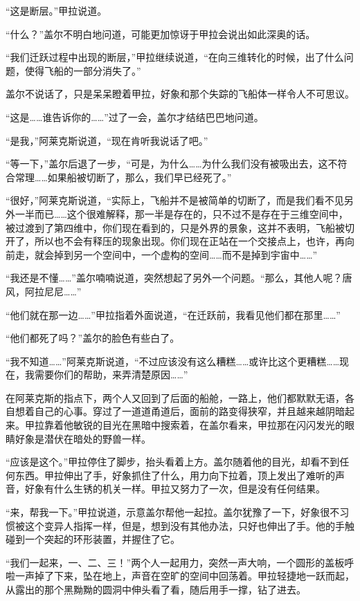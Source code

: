“这是断层。”甲拉说道。 

“什么？”盖尔不明白地问道，可能更加惊讶于甲拉会说出如此深奥的话。 

“我们迁跃过程中出现的断层，”甲拉继续说道，“在向三维转化的时候，出了什么问题，使得飞船的一部分消失了。” 

盖尔不说话了，只是呆呆瞪着甲拉，好象和那个失踪的飞船体一样令人不可思议。 

“这是……谁告诉你的……”过了一会，盖尔才结结巴巴地问道。 

“是我，”阿莱克斯说道，“现在肯听我说话了吧。” 

“等一下，”盖尔后退了一步，“可是，为什么……为什么我们没有被吸出去，这不符合常理……如果船被切断了，那么，我们早已经死了。” 

“很好，”阿莱克斯说道，“实际上，飞船并不是被简单的切断了，而是我们看不见另外一半而已……这个很难解释，那一半是存在的，只不过不是存在于三维空间中，被过渡到了第四维中，你们现在看到的，只是外界的景象，这并不表明，飞船被切开了，所以也不会有释压的现象出现。你们现在正站在一个交接点上，也许，再向前走，就会掉到另一个空间中，一个虚构的空间……而不是掉到宇宙中……” 

“我还是不懂……”盖尔喃喃说道，突然想起了另外一个问题。“那么，其他人呢？唐风，阿拉尼尼……” 

“他们就在那一边……”甲拉指着外面说道，“在迁跃前，我看见他们都在那里……” 

“他们都死了吗？”盖尔的脸色有些白了。 

“我不知道……”阿莱克斯说道，“不过应该没有这么糟糕……或许比这个更糟糕……现在，我需要你们的帮助，来弄清楚原因……” 

在阿莱克斯的指点下，两个人又回到了后面的船舱，一路上，他们都默默无语，各自想着自己的心事。穿过了一道道甬道后，面前的路变得狭窄，并且越来越阴暗起来。甲拉靠着他敏锐的目光在黑暗中搜索着，在盖尔看来，甲拉那在闪闪发光的眼睛好象是潜伏在暗处的野兽一样。 

“应该是这个。”甲拉停住了脚步，抬头看着上方。盖尔随着他的目光，却看不到任何东西。甲拉伸出了手，好象抓住了什么，用力向下拉着，顶上发出了难听的声音，好象有什么生锈的机关一样。甲拉又努力了一次，但是没有任何结果。 

“来，帮我一下。”甲拉说道，示意盖尔帮他一起拉。盖尔犹豫了一下，好象很不习惯被这个变异人指挥一样，但是，想到没有其他办法，只好也伸出了手。他的手触碰到一个突起的环形装置，并握住了它。 

“我们一起来，一、二、三！”两个人一起用力，突然一声大响，一个圆形的盖板呼啦一声掉了下来，坠在地上，声音在空旷的空间中回荡着。甲拉轻捷地一跃而起，从露出的那个黑黝黝的圆洞中伸头看了看，随后用手一撑，钻了进去。 

